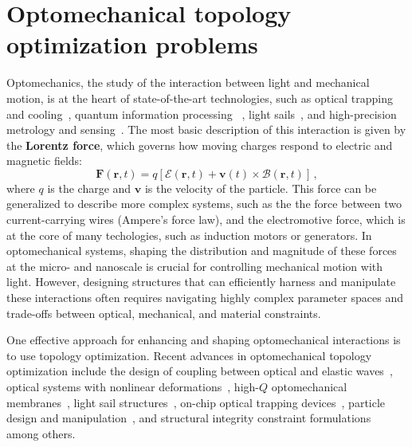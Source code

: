 \chapter{Optomechanical topology optimization problems}
Optomechanics, the study of the interaction between light and mechanical motion, is at the heart of state-of-the-art technologies, such as 
optical trapping~\cite{ashkin_acceleration_1970, moffitt_recent_2008} and cooling~\cite{cooling}, quantum information processing~\cite{Andrews_2014, Xi_2025}
, light sails~\cite{lightsail, lightsail1}, and high-precision metrology and sensing~\cite{sensing, weakforce, Li:18, Mason_2019}. The most basic description of this interaction is given by the \textbf{Lorentz force}, which governs how moving charges respond to electric and magnetic fields:
\begin{equation}\label{eq:lorentz_f}
    \mathbf{\mathbf{F}}(\mathbf{r},t) = q \left[ \bm{\mathcal{E}}(\mathbf{r},t) + \mathbf{v}(t) \times \bm{\mathcal{B}}(\mathbf{r},t) \right]\,,
\end{equation}
where $q$ is the charge and $\mathbf{v}$ is the velocity of the particle. This force can be generalized to describe more complex systems,
such as the the force between two current-carrying 
wires (Ampere's force law), and the electromotive force, which is at the core of many techologies, such as induction motors or generators.
In optomechanical systems, shaping the distribution and magnitude of these forces at the micro- and nanoscale is crucial for controlling mechanical motion with light. 
However, designing structures that can efficiently harness and manipulate these interactions often requires navigating highly complex
 parameter spaces and trade-offs between optical, mechanical, and material constraints.

 One effective approach for enhancing and shaping optomechanical interactions is to use topology optimization.
Recent advances in optomechanical topology optimization include the design of coupling between optical and elastic
 waves~\cite{photo_topopt}, optical systems with nonlinear deformations~\cite{def_wg}, high-$Q$ optomechanical membranes~\cite{highQ1, fengwen, aragon1},
light sail structures~\cite{lightsail_topopt, lightsail_topopt1},
on-chip optical trapping devices~\cite{ownpub1}, particle design and manipulation~\cite{ownpub2, particle_opt},
and structural integrity constraint formulations~\cite{structural_integrity}
 among others.

